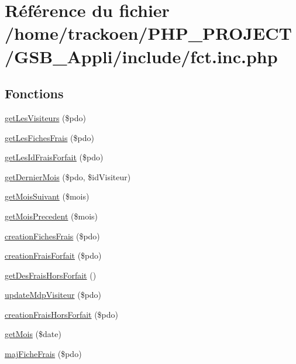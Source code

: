 \hypertarget{fct_8inc_8php}{\section{Référence du fichier /home/trackoen/\-P\-H\-P\-\_\-\-P\-R\-O\-J\-E\-C\-T/\-G\-S\-B\-\_\-\-Appli/include/fct.inc.\-php}
\label{fct_8inc_8php}
}
\subsection*{Fonctions}
\begin{DoxyCompactItemize}
\item 
\hyperlink{fct_8inc_8php_a2acfd2dba761253597a1ab45974a0960}{get\-Les\-Visiteurs} (\$pdo)
\item 
\hyperlink{fct_8inc_8php_a4ddda167f959ca116a8a3e6eeb90fa9e}{get\-Les\-Fiches\-Frais} (\$pdo)
\item 
\hyperlink{fct_8inc_8php_a6308942d3ba830a09e7e94ae7711e484}{get\-Les\-Id\-Frais\-Forfait} (\$pdo)
\item 
\hyperlink{fct_8inc_8php_a24de2eaeae5f67c359ec963e032dc070}{get\-Dernier\-Mois} (\$pdo, \$id\-Visiteur)
\item 
\hyperlink{fct_8inc_8php_a645aa8a245cbeb2d0d167fcc942b9b5c}{get\-Mois\-Suivant} (\$mois)
\item 
\hyperlink{fct_8inc_8php_aeeb91507878426d6313448a6bd1cad7c}{get\-Mois\-Precedent} (\$mois)
\item 
\hyperlink{fct_8inc_8php_aaa271411c3446ad3c57a1429136fc1bf}{creation\-Fiches\-Frais} (\$pdo)
\item 
\hyperlink{fct_8inc_8php_a15cec1f321241d0de7115e96cfccf67f}{creation\-Frais\-Forfait} (\$pdo)
\item 
\hyperlink{fct_8inc_8php_ae0eddc9c28d0ed7a68aa28fa98a6f214}{get\-Des\-Frais\-Hors\-Forfait} ()
\item 
\hyperlink{fct_8inc_8php_ad1a28b1457da19e4210dfa8869d1c874}{update\-Mdp\-Visiteur} (\$pdo)
\item 
\hyperlink{fct_8inc_8php_ad980a8fa84e6aee8092ec6525bf1cd5a}{creation\-Frais\-Hors\-Forfait} (\$pdo)
\item 
\hyperlink{fct_8inc_8php_ac6b26dbc90d7a5ec71b0585ee0786a41}{get\-Mois} (\$date)
\item 
\hyperlink{fct_8inc_8php_a737fc7684b15055a48683ee1f6683b5b}{maj\-Fiche\-Frais} (\$pdo)
\end{DoxyCompactItemize}


